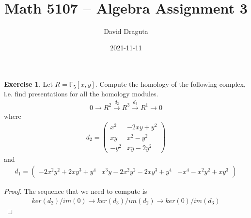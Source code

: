 \documentclass[12pt]{extarticle}
\title{ Math 5107 -- Algebra Assignment 3}
\author{David Draguta}
\date{2021-11-11}
\newcommand{\<}{\langle}
\renewcommand{\>}{\rangle}
\theoremstyle{definition}
\newtheorem{exercise}{Exercise}
\begin{document}
\maketitle

\begin{exercise}
  Let $R = \mathbb{F}_5[x,y]$. Compute the homology of the following complex, i.e. find presentations for all the homology modules.
  \begin{align*}
    0 \xrightarrow{} R^2 \xrightarrow{d_2} R^3 \xrightarrow{d_3} R^1 \xrightarrow{} 0 
  \end{align*}
  where
  \begin{align*}
    d_2 = 
    \begin{pmatrix}
      x^2  & -2xy+y^2 \\
      xy   & x^2 - y^2 \\
      -y^2 & xy - 2y^2 
    \end{pmatrix}
  \end{align*}
  and
    \begin{align*}
    d_1 = 
    \begin{pmatrix}
      -2x^2y^2+2xy^3+y^4 & x^3y-2x^2y^2-2xy^3+y^4 & -x^4-x^2y^2+xy^3
    \end{pmatrix}
  \end{align*}
\end{exercise}
\begin{proof}
  The sequence that we need to compute is
  \begin{align*}
    ker(d_2)/im(0) \xrightarrow{} ker(d_3)/im(d_2) \xrightarrow{} ker(0)/im(d_3) 
  \end{align*}
\end{proof}
\end{document}
